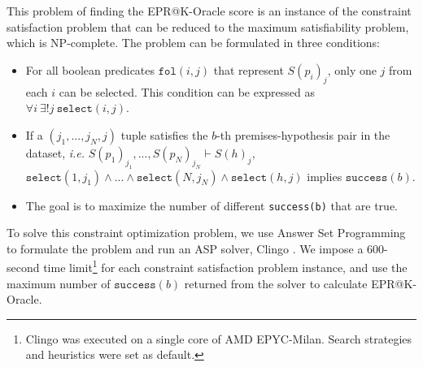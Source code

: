 This problem of finding the EPR@K-Oracle score is an instance of the constraint satisfaction problem that can be reduced to the maximum satisfiability problem, which is NP-complete. The problem can be formulated in three conditions:
\begin{itemize}
    \item For all boolean predicates $\texttt{fol}(i, j)$ that represent $S(p_i)_j$, only one $j$ from each $i$ can be selected. This condition can be expressed as $\forall i\ \exists! j\ \texttt{select}(i, j)$.
    \item If a $(j_1, ..., j_N, j)$ tuple satisfies the $b$-th premises-hypothesis pair in the dataset, \textit{i.e.} $S(p_1)_{j_1}, ..., S(p_N)_{j_N} \vdash S(h)_j$, $\texttt{select}(1, j_1) \land ... \land \texttt{select}(N, j_N) \land \texttt{select}(h, j)$ implies $\texttt{success}(b)$.
    \item The goal is to maximize the number of different \texttt{success(b)} that are true.
\end{itemize}

To solve this constraint optimization problem, we use Answer Set Programming \citep{asp} to formulate the problem and run an ASP solver, Clingo  \citep{clingo}. We impose a 600-second time limit\footnote{Clingo was executed on a single core of AMD EPYC-Milan. Search strategies and heuristics were set as default.} for each constraint satisfaction problem instance, and use the maximum number of $\texttt{success}(b)$ returned from the solver to calculate EPR@K-Oracle.